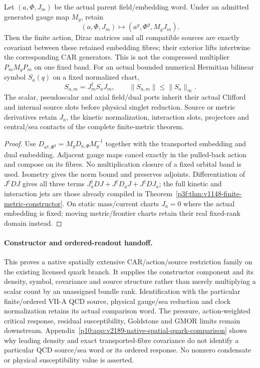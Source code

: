 \documentclass[12pt,a4paper]{article}
\begin{document}
\begin{proposition}
\label{p10:prop:v2189-spatial-quark-source-word}
Let $(a,\Phi,J_m)$ be the actual parent field/embedding word. Under an
admitted generated gauge map $M_g$, retain
\[
 (a,\Phi,J_m)\longmapsto(a^g,\Phi^g,M_gJ_m).
\]
Then the finite action, Dirac matrices and all compatible sources are exactly
covariant between these retained embedding fibres; their exterior lifts
intertwine the corresponding CAR generators. This is not the compressed
multiplier $P_mM_gP_m$ on one fixed band.
For an actual bounded numerical Hermitian bilinear symbol $S_a(q)$ on a
fixed normalized chart,
\[
 S_{a,m}=J_m^\dagger S_aJ_m,
 \qquad\|S_{a,m}\|\le\|S_a\|_\infty.
\]
The scalar, pseudoscalar and axial field/dual ports inherit their actual
Clifford and internal source slots before physical singlet reduction.
Source or metric derivatives retain $J_a$, the kinetic normalization,
interaction slots, projectors and central/sea contacts of the complete
finite-metric theorem.
\end{proposition}
\begin{proof}
Use $D_{a^g,\Phi^g}=M_gD_{a,\Phi}M_g^{-1}$ together with the transported
embedding and dual embedding. Adjacent gauge maps cancel exactly in the
pulled-back action and compose on its fibres. No multiplication closure of
a fixed orbital band is used. Isometry gives the norm bound and preserves
adjoints. Differentiation of $J^\dagger D J$ gives all three terms
$J_a^\dagger DJ+J^\dagger D_aJ+J^\dagger DJ_a$;
the full kinetic and interaction jets are those already compiled in
Theorem~\ref{p3f:thm:v1148-finite-metric-constructor}.
On static mass/current charts $J_a=0$ where the actual embedding is fixed;
moving metric/frontier charts retain their real fixed-rank domain instead.
\end{proof}

\paragraph{Constructor and ordered-readout handoff.}
This proves a native spatially extensive CAR/action/source restriction family
on the existing licensed quark branch. It supplies the constructor component
and its density, symbol, covariance and source structure rather than merely
multiplying a scalar count by an unassigned bundle rank.
Identification with the particular finite/ordered VII-A QCD source, physical
gauge/sea reduction and clock normalization retains its actual comparison
word. The pressure, action-weighted critical response, residual susceptibility,
Goldstone and GMOR limits remain downstream. Appendix~\ref{p10:app:v2189-native-spatial-quark-comparison} shows why
leading density and exact transported-fibre covariance do not identify a
particular QCD source/sea word or its ordered response. No nonzero condensate
or physical susceptibility value is asserted.
\end{document}
